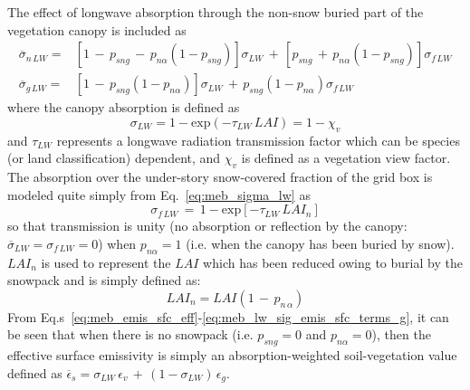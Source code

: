 %
%
%
The effect of longwave absorption through the non-snow buried
part of the vegetation canopy is included as
%
\begin{align}
 \label{eq:meb_lw_sig_emis_sfc_terms_n}
{\overline\sigma}_{n\,LW} = & 
\left[1 \,-\, p_{sng} \,-\, p_{n\alpha}\left(1-p_{sng}\right)\right]
\sigma_{LW} 
\,+\, 
\left[p_{sng} \,+\, p_{n\alpha}\left(1-p_{sng}\right)\right]
\sigma_{f\,LW}
\\
 \label{eq:meb_lw_sig_emis_sfc_terms_g}
{\overline\sigma}_{g\,LW} = & 
\left[1 \,-\, p_{sng}\left(1-p_{n\alpha}\right)\right]
\sigma_{LW} 
\,+\, 
p_{sng}\left(1-p_{n\alpha}\right)
\sigma_{f\,LW}
%
\end{align}
%
where the canopy absorption is defined as
%
\begin{equation}
\label{eq:meb_sigma_lw}
%
\sigma_{LW} = 1 - {\mathrm{exp}}\left( -\tau_{LW} \, LAI \right) = 1 - \chi_v
%
\end{equation}
%
and $\tau_{LW}$ represents a longwave radiation transmission factor which can be species 
(or land classification) dependent, and $\chi_v$ is defined as a
vegetation view factor. 
%
The absorption over the under-story snow-covered fraction of the grid
box is modeled quite simply from Eq.~\ref{eq:meb_sigma_lw} as
%
\begin{equation}
\label{eq:meb_sigma_f_lw}
%
\sigma_{f\,LW} \,=\, 
1 - {\mathrm{exp}}\left[ -\tau_{LW} \, LAI_n \right]
%
\end{equation}
%
so that transmission is unity (no absorption or reflection by the canopy: 
${\overline\sigma}_{LW}=\sigma_{f\,LW}=0$) when $p_{n\alpha}=1$
(i.e. when the canopy has been buried by snow).
$LAI_n$ is used to represent the $LAI$ which has been reduced owing to
burial by the snowpack and is simply defined as:
%
\begin{equation}
  \label{eq:meb_lai_snow_modif}
LAI_n = LAI \left(1 \,-\, p_{n\,\alpha}\right)
\end{equation}
%
From Eq.s~\ref{eq:meb_emis_sfc_eff}-\ref{eq:meb_lw_sig_emis_sfc_terms_g}, it
can be seen that when there is no snowpack (i.e. $p_{sng}=0$ and
$p_{n\alpha}=0$),
then the effective surface emissivity is simply an absorption-weighted
soil-vegetation value defined as ${\overline\epsilon}_s =  
\sigma_{LW}       \,\epsilon_v \,+\, 
\left(1-\sigma_{LW}\right)\,\epsilon_g$.
%



